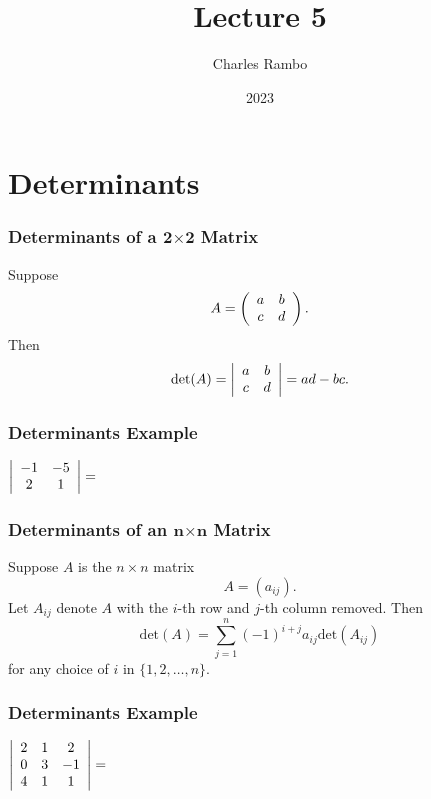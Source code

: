 \documentclass{beamer}
\title{Lecture 5}
\author{Charles Rambo}
\institute{UCLA Anderson School of Management}
\date{2023}
\begin{document}
\insertTitleSlide


\section{Determinants}

\begin{frame}
\frametitle{Determinants of a $\boldsymbol 2\boldsymbol\times \boldsymbol2$ Matrix}
Suppose 
$$
A = \left(\begin{array}{c c} a	&	b\\ c	& d\end{array}\right).
$$
Then
$$
\text{det}(A) = \left| \begin{array}{c c} a	&	b\\ c	& d\end{array}\right| = ad - bc.
$$
\end{frame}

\begin{frame}[t]
\frametitle{Determinants Example}
\begin{Example}
$\left|\begin{array}{c c} -1	&	-5\\	2	&	1\end{array}\right|=$
\end{Example}

\end{frame}

\begin{frame}
\frametitle{Determinants of an $\boldsymbol n\boldsymbol\times\boldsymbol n$ Matrix}
Suppose $A$ is the $n\times n$ matrix
$$
A = \left(a_{ij} \right).
$$
Let $A_{ij}$ denote $A$ with the $i$-th row and $j$-th column removed. Then
$$
\text{det}(A) = \sum_{j = 1}^n (-1)^{i + j} a_{ij}\text{det}(A_{ij})
$$
for any choice of $i$ in $\{1, 2,\ldots, n\}$.

\end{frame}

\begin{frame}[t]
\frametitle{Determinants Example}
\begin{Example}
$
\left|\begin{array}{c c c} 2	&	1	&	2\\	0	&	3	&	-1\\	4	&	1	&	1\end{array}\right| = 
$
\end{Example}

\end{frame}
\end{document}
